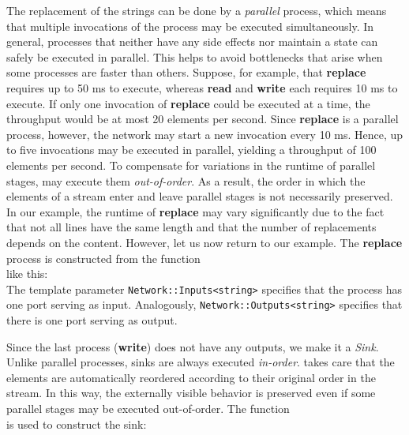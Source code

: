 The replacement of the strings can be done by a \emph{parallel} process, which means that multiple invocations of the process may be executed simultaneously. In general, processes that neither have any side effects nor maintain a state can safely be executed in parallel. This helps to avoid bottlenecks that arise when some processes are faster than others. Suppose, for example, that \textbf{replace} requires up to 50 ms to execute, whereas \textbf{read} and \textbf{write} each requires 10 ms to execute. If only one invocation of \textbf{replace} could be executed at a time, the throughput would be at most 20 elements per second. Since \textbf{replace} is a parallel process, however, the network may start a new invocation every 10 ms. Hence, up to five invocations may be executed in parallel, yielding a throughput of 100 elements per second. To compensate for variations in the runtime of parallel stages, \embb may execute them \emph{out-of-order}. As a result, the order in which the elements of a stream enter and leave parallel stages is not necessarily preserved. In our example, the runtime of \textbf{replace} may vary significantly due to the fact that not all lines have the same length and that the number of replacements depends on the content. However, let us now return to our example. The \textbf{replace} process is constructed from the function
%
\\
%
like this:
%
\\
%
The template parameter \lstinline|Network::Inputs<string>| specifies that the process has one port serving as input. Analogously, \lstinline|Network::Outputs<string>| specifies that there is one port serving as output.

Since the last process (\textbf{write}) does not have any outputs, we make it a \emph{Sink}. Unlike parallel processes, sinks are always executed \emph{in-order}. \embb takes care that the elements are automatically reordered according to their original order in the stream. In this way, the externally visible behavior is preserved even if some parallel stages may be executed out-of-order. The function
%
\\
%
is used to construct the sink:
%
\\
%

